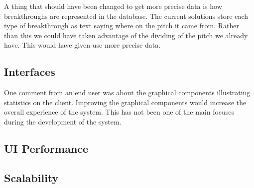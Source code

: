 A thing that should have been changed to get more precise data is how breakthroughs are represented in the database. The current solutions store each type of breakthrough as text saying where on the pitch it came from. Rather than this we could have taken advantage of the dividing of the pitch we already have. This would have given use more precise data.

\subsection{Interfaces}

One comment from an end user was about the graphical components illustrating statistics on the client. Improving the graphical components would increase the overall experience of the system. This has not been one of the main focuses during the development of the system.

\subsection{UI Performance}

\subsection{Scalability}





